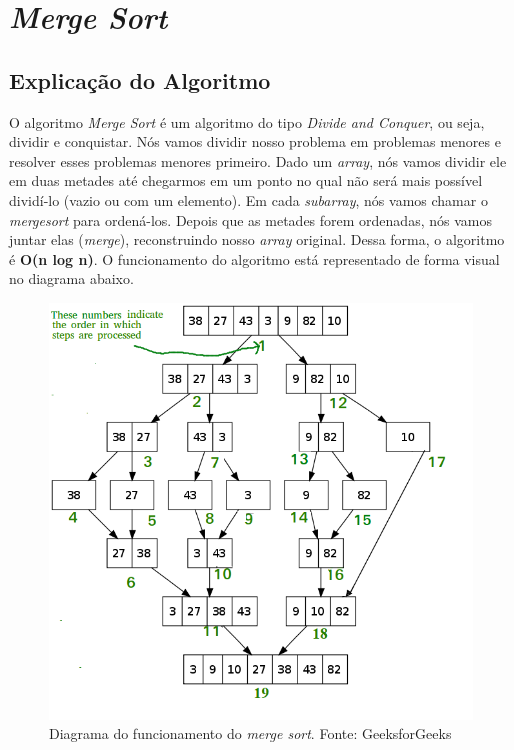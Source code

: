\section{\textit{Merge Sort}}

\subsection{Explicação do Algoritmo}
O algoritmo \textit{Merge Sort} é um algoritmo do tipo \textit{Divide and Conquer}, ou seja, dividir e conquistar. Nós vamos dividir nosso problema
em problemas menores e resolver esses problemas menores primeiro. Dado um \textit{array}, nós vamos dividir ele em duas metades até chegarmos em um ponto
no qual não será mais possível dividí-lo (vazio ou com um elemento). Em cada \textit{subarray}, nós vamos chamar o \textit{mergesort} para ordená-los.
Depois que as metades forem ordenadas, nós vamos juntar elas (\textit{merge}), reconstruindo nosso \textit{array} original. Dessa forma, o algoritmo é \textbf{O(n log n)}. O funcionamento do algoritmo está representado de forma visual
no diagrama abaixo.

\begin{figure}[H]
    \centering
    \includegraphics[scale=0.6]{assets/mergesort_diagram.png}
    \caption{Diagrama do funcionamento do \textit{merge sort}. Fonte: GeeksforGeeks}
    \label{fig:merge_sort_0}
\end{figure}

